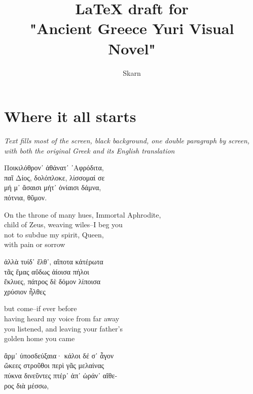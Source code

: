 \documentclass{report}
\title{LaTeX draft for \\"Ancient Greece Yuri Visual Novel"}
\author{Skarn}
\newcommand{\dcomment}[1]{
	\emph{#1}
	\\
}
\begin{document}
\maketitle

\chapter*{Where it all starts}


\dcomment{
	Text fills most of the screen, black background, one double paragraph by screen, with both the original Greek and its English translation
}

\begin{otherlanguage}{greek}
Ποικιλόθρον᾽ ἀθάνατ᾽ ᾽Αφρόδιτα,\\
παῖ Δίος, δολόπλοκε, λίσσομαί σε\\
μή μ᾽ ἄσαισι μήτ᾽ ὀνίαισι δάμνα,\\
πότνια, θῦμον.
\end{otherlanguage}

On the throne of many hues, Immortal Aphrodite,\\
child of Zeus, weaving wiles--I beg you\\
not to subdue my spirit, Queen,\\
with pain or sorrow
\\

\begin{otherlanguage}{greek}
ἀλλὰ τυίδ᾽ ἔλθ᾽, αἴποτα κἀτέρωτα\\
τᾶς ἔμας αὔδως ἀίοισα πήλοι\\
ἔκλυες, πάτρος δὲ δόμον λίποισα\\
χρύσιον ἦλθες
\end{otherlanguage}

but come--if ever before\\
having heard my voice from far away\\
you listened, and leaving your father's\\
golden home you came
\\

\begin{otherlanguage}{greek}
ἄρμ᾽ ὐποσδεύξαια· κάλοι δέ σ᾽ ἆγον\\
ὤκεες στροῦθοι περὶ γᾶς μελαίνας\\
πύκνα δινεῦντες πτέρ᾽ ἀπ᾽ ὠράν᾽ αἴθε-\\
ρος διὰ μέσσω,
\end{otherlanguage}
\end{document}
